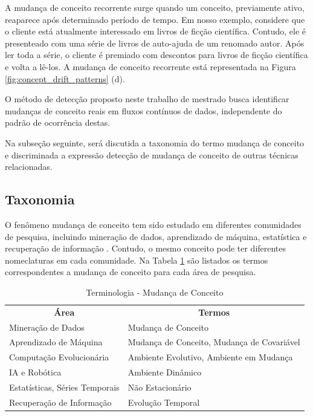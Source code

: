 \documentclass[qual, classic, a4paper]{ufbathesis}
\begin{document}
A mudança de conceito recorrente surge quando um conceito, previamente ativo, reaparece após determinado período de tempo.
Em nosso exemplo, considere que o cliente está atualmente interessado em livros de ficção científica.
Contudo, ele é presenteado com uma série de livros de auto-ajuda de um renomado autor.
Após ler toda a série, o cliente é premiado com descontos para livros de ficção científica e volta a lê-los.
A mudança de conceito recorrente está representada na Figura \ref{fig:concept_drift_patterns} (d).

O método de detecção proposto neste trabalho de mestrado busca identificar mudanças de conceito reais em fluxos contínuos de dados, independente do padrão de ocorrência destas.

Na subseção seguinte, será discutida a taxonomia do termo mudança de conceito e discriminada a expressão detecção de mudança de conceito de outras técnicas relacionadas.

\subsection{Taxonomia}

O fenômeno mudança de conceito tem sido estudado em diferentes comunidades de pesquisa, incluindo mineração de dados, 
aprendizado de máquina, estatística e recuperação de informação \cite{Zliobaite:2010}.
Contudo, o mesmo conceito pode ter diferentes nomeclaturas em cada comunidade.
Na Tabela \ref{tbl:taxonomy} são listados os termos correspondentes a mudança de conceito para cada área de pesquisa.

\begin{center} 
\begin{table}[H]
\label{tbl:taxonomy}
\begin{tabularx}{\textwidth}{|l|X|}
\cline{1-2}
\multicolumn{1}{|c|}{\textbf{Área}} & \multicolumn{1}{c|}{\textbf{Termos}}       \\ \cline{1-2}
Mineração de Dados                  & Mudança de Conceito                        \\ \cline{1-2}
Aprendizado de Máquina              & Mudança de Conceito, Mudança de Covariável \\ \cline{1-2}
Computação Evolucionária            & Ambiente Evolutivo, Ambiente em Mudança    \\ \cline{1-2}
IA e Robótica                       & Ambiente Dinâmico                          \\ \cline{1-2}
Estatísticas, Séries Temporais      & Não Estacionário                           \\ \cline{1-2}
Recuperação de Informação           & Evolução Temporal                          \\ \cline{1-2}
\end{tabularx}
\caption{Terminologia - Mudança de Conceito \cite{Zliobaite:2010}}
\end{table}
\end{center}
\end{document}
